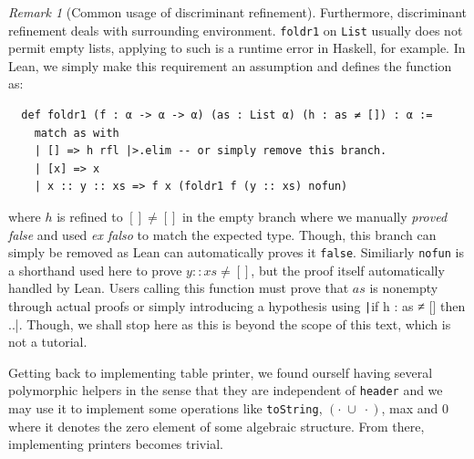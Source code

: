 \documentclass[a4paper, 11pt]{article}
\theoremstyle{remark}\newtheorem*{remark}{Remark}
\theoremstyle{definition}\newtheorem*{definition}{Definition}
\begin{document}
\begin{remark}[Common usage of discriminant refinement]
Furthermore, discriminant refinement deals with surrounding environment.
\texttt{foldr1} on \texttt{List} usually does not permit empty lists,
applying to such is a runtime error in Haskell, for example. In Lean, we simply make
this requirement an assumption and defines the function as:
\begin{verbatim}
  def foldr1 (f : α -> α -> α) (as : List α) (h : as ≠ []) : α :=
    match as with
    | [] => h rfl |>.elim -- or simply remove this branch.
    | [x] => x
    | x :: y :: xs => f x (foldr1 f (y :: xs) nofun)
\end{verbatim}
where $h$ is refined to $[]\neq[]$ in the empty branch where we manually \emph{proved false} and used
\emph{ex falso} to match the expected type. Though, this branch can simply be removed as Lean can automatically
proves it \texttt{false}. Similiarly \texttt{nofun} is a shorthand used here to prove $y :: xs \neq []$, but the
proof itself automatically handled by Lean. Users calling this function must prove that $as$ is nonempty through
actual proofs or simply introducing a hypothesis using \texttt|if h : as ≠ [] then ..|. Though, we
shall stop here as this is beyond the scope of this text, which is not a tutorial.
\end{remark}

Getting back to implementing table printer, we found ourself having several polymorphic helpers in the sense
that they are independent of \texttt{header} and we may use it to implement some operations like \texttt{toString},
$(\cdot\;\cup\;\cdot)$, max and $0$ where it denotes the zero element of some algebraic structure. From there,
implementing printers becomes trivial.
\end{document}
